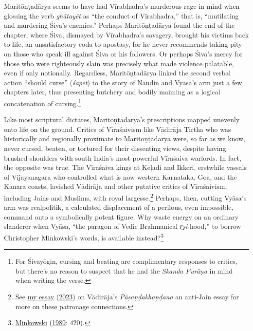 Maritōṇṭadārya seems to have had Vīrabhadra’s murderous rage in mind when glossing the verb \emph{ghātayēt} as “the conduct of Vīrabhadra,” that is, “mutilating and murdering Śiva’s enemies.” Perhaps Maritōṇṭadārya found the end of the chapter, where Śiva, dismayed by Vīrabhadra’s savagery, brought his victims back to life, an unsatisfactory coda to apostasy, for he never recommends taking pity on those who speak ill against Śiva or his followers. Or perhaps Śiva’s mercy for those who were righteously slain was precisely what made violence palatable, even if only notionally. Regardless, Maritōṇṭadārya linked the second verbal action  \Dash  “should curse” (\emph{śapēt})  \Dash  to the story of Nandin and Vyāsa’s arm just a few chapters later, thus presenting butchery and bodily maiming as a logical concatenation of cursing.\footnote{%
For Śivayōgin, cursing and beating are complimentary responses to critics, but there’s no reason to suspect that he had the \emph{{Skanda Purāṇa}} in mind when writing the verse.
}



Like most scriptural dictates, Maritōṇṭadārya’s prescriptions mapped unevenly onto life on the ground. Critics of Vīraśaivism like Vādirāja Tīrtha  \Dash  who was historically and regionally proximate to Maritōṇṭadārya  \Dash  were, so far as we know, never cursed, beaten, or tortured for their dissenting views, despite having brushed shoulders with south India’s most powerful Vīraśaiva warlords. In fact, the opposite was true. The Vīraśaiva kings at Keḷadi and Ikkeri, erstwhile vassals of Vijayanagara who controlled what is now western Karnataka, Goa, and the Kanara coasts, lavished Vādirāja and other putative critics of Vīraśaivism, including Jains and Muslims, with royal largesse.\footnote{%
See \hyperref[Peterson2023]{my essay} (\hyperref[Peterson2023]{2023}) on Vādirāja’s \emph{{Pāṣaṇḍakhaṇḍana}}  \Dash  an anti-Jain essay  \Dash  for more on these patronage connections.
}
 Perhaps, then, cutting Vyāsa’s arm was realpolitik, a calculated displacement of a perilous, even impossible, command onto a symbolically potent figure. Why waste energy on an ordinary slanderer when Vyāsa, “the paragon of Vedic Brahmanical \emph{r̥ṣi}-hood,” to borrow Christopher Minkowski’s words, is available instead?\footnote{%
\hyperref[Minkowski1989]{Minkowski} (\hyperref[Minkowski1989]{1989}: 420).
}


